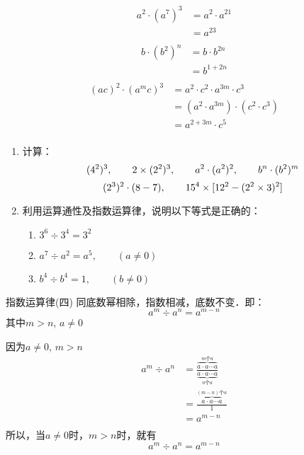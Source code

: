 \begin{solution}
\begin{align*}
            a^2\cdot (a^7)^3&=a^2\cdot a^{21} \tag{指数运算律（三）}\\
            &= a^{23} \tag{指数运算律（一）}\\
        \end{align*}
\begin{align*}
            b\cdot (b^2)^n&=b\cdot b^{2n} \tag{指数运算律（三）}\\
            &= b^{1+2n} \tag{指数运算律（一）}\\
        \end{align*}
\begin{align*}
            (ac)^2\cdot (a^m c)^3&=a^2\cdot c^2\cdot a^{3m}\cdot c^3 \tag{指数运算律（三）}\\
&=(a^2\cdot a^{3m})\cdot (c^2\cdot c^3) \tag{乘法交换、结合律}\\
            &= a^{2+3m}\cdot c^5 \tag{指数运算律（一）}\\
        \end{align*}        
\end{solution}

\begin{ex}
 \begin{enumerate}
     \item 计算：
           $$(4^2)^3,\qquad 2 \times (2^2)^3,\qquad a^2\cdot (a^2)^2,\qquad b^n\cdot (b^2)^m$$
       $$(2^3)^2 \cdot (8-7),\qquad       15^4 \times [12^2-(2^2 \times3)^2]$$
       \item 利用运算通性及指数运算律，说明以下等式是正确的：
 \begin{enumerate}
     \item $3^6\div 3^4=3^2$
     \item $a^7\div a^2=a^5,\qquad (a\ne 0)$
     \item $b^4\div b^4=1, \qquad (b\ne 0)$
 \end{enumerate}
     
 \end{enumerate}   
\end{ex}

\begin{blk}{指数运算律(四)}
    同底数幂相除，指数相减，底数不变．即：
\[a^m \div a^n=a^{m-n}\]
其中$m>n$,  $a\ne 0$
\end{blk}

\begin{rmk}
    因为$a\ne 0$, $m>n$
\begin{align*}
    a^m \div a^n&=\frac{\overbrace{a\cdot a\cdots a}^{\text{$m$个$a$}}}{\underbrace{a\cdot a\cdots a}_{\text{$n$个$a$}}}  \tag{乘方的意义}\\
    &=\frac{\overbrace{a\cdot a\cdots a}^{\text{$(m-n)$个$a$}}}{1}  \tag{除法的性质}\\
    &=a^{m-n}\tag{乘方的意义}\\
\end{align*}    
所以，当$a\ne 0$时，$m>n$时，就有
\[a^m \div a^n=a^{m-n}\]
\end{rmk}

